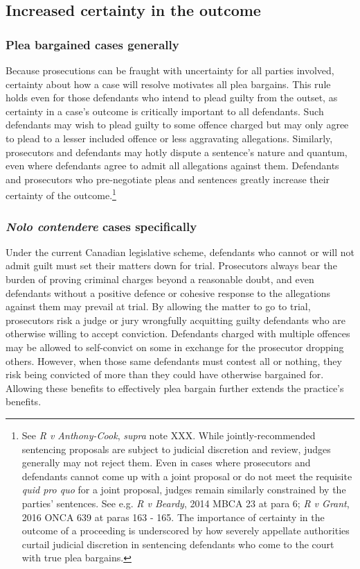 \subsection{Increased certainty in the outcome}

\subsubsection{Plea bargained cases generally}

Because prosecutions can be fraught with uncertainty for all parties involved, certainty about how a case will resolve motivates all plea bargains. This rule holds even for those defendants who intend to plead guilty from the outset, as certainty in a case's outcome is critically important to all defendants. Such defendants may wish to plead guilty to some offence charged but may only agree to plead to a lesser included offence or less aggravating allegations. Similarly, prosecutors and defendants may hotly dispute a sentence's nature and quantum, even where defendants agree to admit all allegations against them. Defendants and prosecutors who pre-negotiate pleas and sentences greatly increase their certainty of the outcome.\footnote{See \textit{R v Anthony-Cook}, \textit{supra} note XXX. While jointly-recommended sentencing proposals are subject to judicial discretion and review, judges generally may not reject them. Even in cases where prosecutors and defendants cannot come up with a joint proposal or do not meet the requisite \textit{quid pro quo} for a joint proposal, judges remain similarly constrained by the parties' sentences. See e.g. \textit{R v Beardy}, 2014 MBCA 23 at para 6; \textit{R v Grant}, 2016 ONCA 639 at paras 163 - 165. The importance of certainty in the outcome of a proceeding is underscored by how severely appellate authorities curtail judicial discretion in sentencing defendants who come to the court with true plea bargains.}

\subsubsection{\textit{Nolo contendere} cases specifically}

Under the current Canadian legislative scheme, defendants who cannot or will not admit guilt must set their matters down for trial. Prosecutors always bear the burden of proving criminal charges beyond a reasonable doubt, and even defendants without a positive defence or cohesive response to the allegations against them may prevail at trial. By allowing the matter to go to trial, prosecutors risk a judge or jury wrongfully acquitting guilty defendants who are otherwise willing to accept conviction. Defendants charged with multiple offences may be allowed to self-convict on some in exchange for the prosecutor dropping others. However, when those same defendants must contest all or nothing, they risk being convicted of more than they could have otherwise bargained for. Allowing these benefits to effectively plea bargain further extends the practice's benefits.

